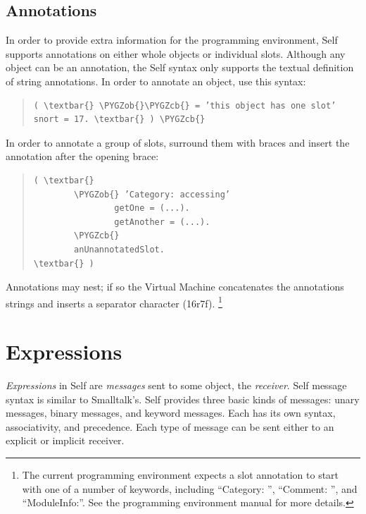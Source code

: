 \documentclass[letterpaper,10pt,english]{sphinxmanual}
\def\PYGZob{\char`\{}
\def\PYGZcb{\char`\}}
\begin{document}

\subsection{Annotations}
\label{langref:annotations}\label{langref:index-42}
In order to provide extra information for the programming environment, Self supports annotations on either whole objects or individual slots. Although any object can be an annotation, the Self syntax only supports the textual definition of string annotations. In order to annotate an object, use this syntax:
\begin{quote}

\begin{Verbatim}[commandchars=\\\{\}]
( \textbar{} \PYGZob{}\PYGZcb{} = ’this object has one slot’ snort = 17. \textbar{} ) \PYGZcb{}
\end{Verbatim}
\end{quote}

In order to annotate a group of slots, surround them with braces and insert the annotation after the opening brace:
\begin{quote}

\begin{Verbatim}[commandchars=\\\{\}]
( \textbar{}
        \PYGZob{} ’Category: accessing’
                getOne = (...).
                getAnother = (...).
        \PYGZcb{}
        anUnannotatedSlot.
\textbar{} )
\end{Verbatim}
\end{quote}

Annotations may nest; if so the Virtual Machine concatenates the annotations strings and inserts a separator character (16r7f). \footnote{
The current programming environment expects a slot annotation to start with one of a number of keywords, including ``Category: '', ``Comment: '', and ``ModuleInfo:''. See the programming environment manual for more details.
}


\section{Expressions}
\label{langref:expressions}
\emph{Expressions} in Self are \emph{messages} sent to some object, the \emph{receiver}. Self message syntax is similar to Smalltalk’s. Self provides three basic kinds of messages: unary messages, binary messages, and keyword messages. Each has its own syntax, associativity, and precedence. Each type of message can be sent either to an explicit or implicit receiver.
\end{document}
